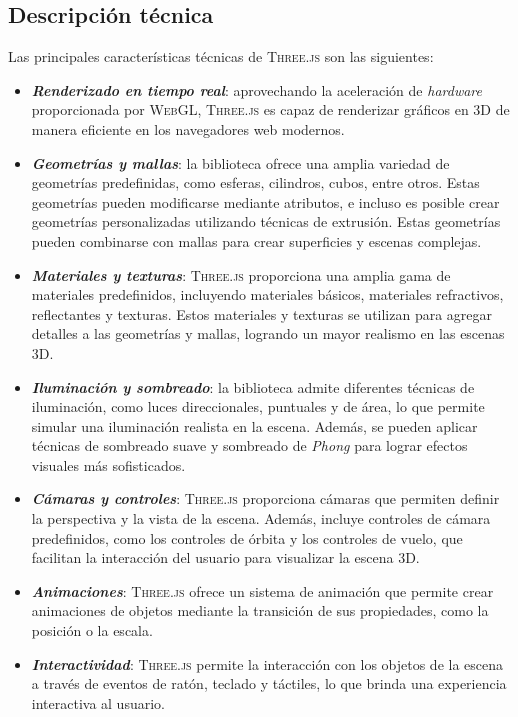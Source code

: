 \documentclass[a4paper, 11pt]{book}
\begin{document}
\subsection{Descripción técnica}
Las principales características técnicas de \textsc{Three.js} son las siguientes:
\begin{itemize}
	\item \textbf{\emph{Renderizado en tiempo real}}: aprovechando la aceleración de \emph{\gls{hardware}} proporcionada por \textsc{WebGL}, \textsc{Three.js} es capaz de renderizar gráficos en \textsc{3D} de manera eficiente en los navegadores web modernos.
	\item \textbf{\emph{Geometrías y mallas}}: la biblioteca ofrece una amplia variedad de geometrías predefinidas, como esferas, cilindros, cubos, entre otros. Estas geometrías pueden modificarse mediante atributos, e incluso es posible crear geometrías personalizadas utilizando técnicas de extrusión. Estas geometrías pueden combinarse con mallas para crear superficies y escenas complejas.
	\item \textbf{\emph{Materiales y texturas}}: \textsc{Three.js} proporciona una amplia gama de materiales predefinidos, incluyendo materiales básicos, materiales refractivos, reflectantes y texturas. Estos materiales y texturas se utilizan para agregar detalles a las geometrías y mallas, logrando un mayor realismo en las escenas \textsc{3D}.
	\item \textbf{\emph{Iluminación y sombreado}}: la biblioteca admite diferentes técnicas de iluminación, como luces direccionales, puntuales y de área, lo que permite simular una iluminación realista en la escena. 
	Además, se pueden aplicar técnicas de sombreado suave y sombreado de \emph{Phong} para lograr efectos visuales más sofisticados.
	\item \textbf{\emph{Cámaras y controles}}: \textsc{Three.js} proporciona cámaras que permiten definir la perspectiva y la vista de la escena. Además, incluye controles de cámara predefinidos, como los controles de órbita y los controles de vuelo, que facilitan la interacción del usuario para visualizar la escena \textsc{3D}.
	\item \textbf{\emph{Animaciones}}: \textsc{Three.js} ofrece un sistema de animación que permite crear animaciones de objetos mediante la transición de sus propiedades, como la posición o la escala.
	\item \textbf{\emph{Interactividad}}: \textsc{Three.js} permite la interacción con los objetos de la escena a través de eventos de ratón, teclado y táctiles, lo que brinda una experiencia interactiva al usuario.
\end{itemize}
\end{document}
